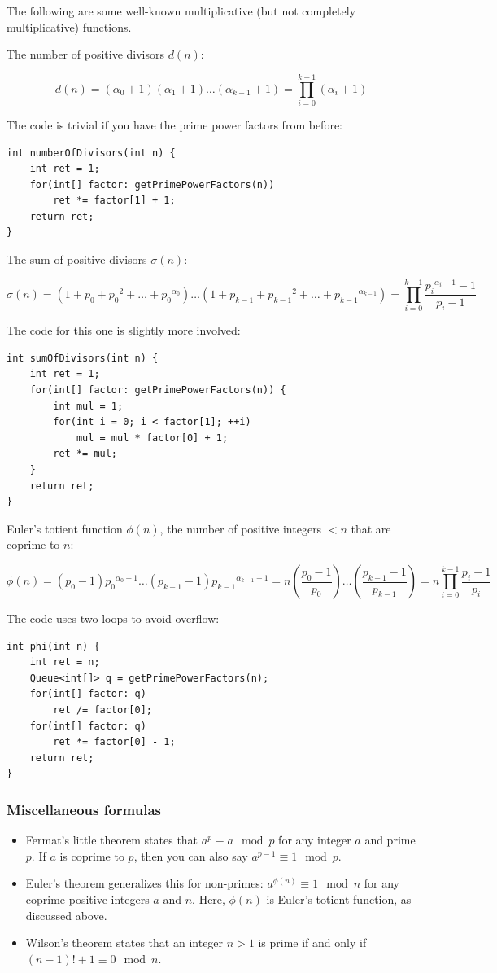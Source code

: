 \documentclass[a4paper,12pt]{article}
\begin{document}
The following are some well-known multiplicative (but not completely multiplicative) functions.

The number of positive divisors $d(n)$:

\[d(n) = (\alpha_0 + 1)(\alpha_1 + 1)\ldots(\alpha_{k-1} + 1) = \prod_{i=0}^{k-1}{(\alpha_i+1)} \]

\noindent The code is trivial if you have the prime power factors from before:

\begin{lstlisting}
int numberOfDivisors(int n) {
	int ret = 1;
	for(int[] factor: getPrimePowerFactors(n))
		ret *= factor[1] + 1;
	return ret;
}
\end{lstlisting}

\noindent The sum of positive divisors $\sigma(n)$:

\[\sigma(n) = (1 + p_0 + {p_0}^2 + \ldots + {p_0}^{\alpha_0})\ldots(1 + p_{k-1} + {p_{k-1}}^2 + \ldots + {p_{k-1}}^{\alpha_{k-1}}) = \prod_{i=0}^{k-1}{\frac{{p_i}^{\alpha_i+1} - 1}{p_i - 1}} \]

\noindent The code for this one is slightly more involved:

\begin{lstlisting}
int sumOfDivisors(int n) {
	int ret = 1;
	for(int[] factor: getPrimePowerFactors(n)) {
		int mul = 1;
		for(int i = 0; i < factor[1]; ++i)
			mul = mul * factor[0] + 1;
		ret *= mul;
	}
	return ret;
}
\end{lstlisting}

\noindent Euler's totient function $\phi(n)$, the number of positive integers $<n$ that are coprime to $n$:

\[\phi(n) = (p_0 - 1){p_0}^{\alpha_0-1}\ldots(p_{k-1} - 1){p_{k-1}}^{\alpha_{k-1}-1} = n\left(\frac{p_0-1}{p_0}\right)\ldots\left(\frac{p_{k-1}-1}{p_{k-1}}\right) = n\prod_{i=0}^{k-1}{\frac{p_i - 1}{p_i}} \]

\noindent The code uses two loops to avoid overflow:

\begin{lstlisting}
int phi(int n) {
	int ret = n;
	Queue<int[]> q = getPrimePowerFactors(n);
	for(int[] factor: q)
		ret /= factor[0];
	for(int[] factor: q)
		ret *= factor[0] - 1;
	return ret;
}
\end{lstlisting}

\subsubsection{Miscellaneous formulas}
\begin{itemize}
\item Fermat's little theorem states that $a^p \equiv a \mod{p}$ for any integer $a$ and prime $p$. If $a$ is coprime to $p$, then you can also say $a^{p-1} \equiv 1 \mod{p}$.
\item Euler's theorem generalizes this for non-primes: $a^{\phi(n)} \equiv 1 \mod{n}$ for any coprime positive integers $a$ and $n$. Here, $\phi(n)$ is Euler's totient function, as discussed above.
\item Wilson's theorem states that an integer $n>1$ is prime if and only if $(n-1)!+1 \equiv 0 \mod{n}$.
\end{itemize}
\end{document}
